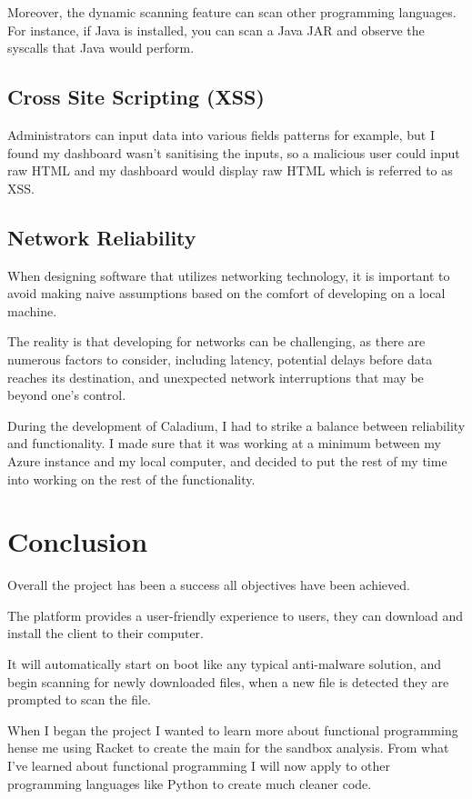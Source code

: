 Moreover, the dynamic scanning feature can scan other programming languages.
For instance, if Java is installed, you can scan a Java JAR
and observe the syscalls that Java would perform.

\subsection{Cross Site Scripting (XSS)}
Administrators can input data into various fields patterns for example,
but I found my dashboard wasn't sanitising the inputs,
so a malicious user could input raw HTML and my dashboard would
display raw HTML which is referred to as XSS.

\subsection{Network Reliability}
When designing software that utilizes networking technology,
it is important to avoid making naive assumptions based
on the comfort of developing on a local machine.

The reality is that developing for networks can be challenging, 
as there are numerous factors to consider,
including latency, potential delays before data reaches its destination,
and unexpected network interruptions that may be beyond one's control.

During the development of Caladium,
I had to strike a balance between reliability and functionality.
I made sure that it was working at a minimum between my
Azure instance and my local computer,
and decided to put the rest of my time into working on the rest of the functionality.

\section{Conclusion}
Overall the project has been a success all objectives have been achieved.

The platform provides a user-friendly experience to users,
they can download and install the client to their computer.

It will automatically start on boot like any typical anti-malware solution,
and begin scanning for newly downloaded files,
when a new file is detected they are prompted to scan the file.

When I began the project I wanted to learn more about functional programming hense
me using Racket to create the main for the sandbox analysis.
From what I've learned about functional programming I will now apply to
other programming languages like Python to create much cleaner code.